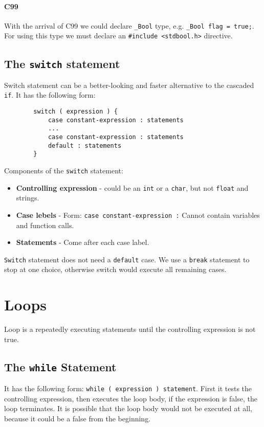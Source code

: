 \documentclass[openany]{book}
\begin{document}
    \subsubsection*{C99}
    With the arrival of C99 we could declare \texttt{\_Bool} type, e.g. \texttt{\_Bool flag = true;}. For using this type we must declare an \texttt{\#include <stdbool.h>} directive.
    
    \section{The \texttt{switch} statement}
    Switch statement can be a better-looking and faster alternative to the cascaded
    \texttt{if}. It has the following form:
    \begin{lstlisting}
        switch ( expression ) {
            case constant-expression : statements
            ...
            case constant-expression : statements
            default : statements
        }
    \end{lstlisting}
    
    Components of the \texttt{switch} statement:
    \begin{itemize}
        \item \textbf{Controlling expression} - could be an \texttt{int} or a
        \texttt{char}, but not \texttt{float} and strings.
        \item \textbf{Case lebels} - Form: \texttt{case constant-expression :} Cannot contain variables and function calls.
        \item \textbf{Statements} - Come after each case label.
    \end{itemize}
    \texttt{Switch} statement does not need a \texttt{default} case. We use a \texttt{break} statement to stop at one choice, otherwise switch would execute all remaining cases.



    \chapter{Loops}
    Loop is a repeatedly executing statements until the controlling expression is not true.
    
    \section{The \texttt{while} Statement}
    It has the following form: \texttt{while ( expression ) statement}. First it tests the controlling expression, then executes the loop body, if the expression is false, the loop terminates. It is possible that the loop body would not be executed at all, because it could be a false from the beginning.
    
\end{document}
